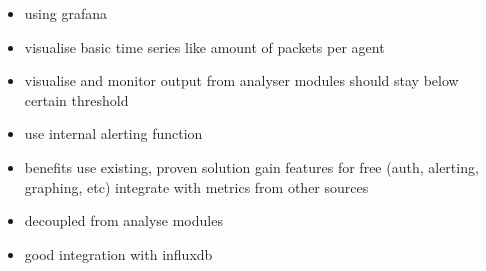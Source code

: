 \begin{itemize}
	\item using \gls{grafana}
	\item visualise basic time series like amount of packets per agent
	\item visualise and monitor output from analyser modules
		\subitem should stay below certain threshold
	\item use internal alerting function
	\item benefits
		\subitem use existing, proven solution
		\subitem gain features for free (auth, alerting, graphing, etc)
		\subitem integrate with metrics from other sources
	\item decoupled from analyse modules
	\item good integration with \gls{influxdb}
\end{itemize}
